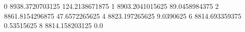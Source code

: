 0 8938.3720703125 124.2138671875
1 8903.2041015625 89.0458984375
2 8861.8154296875 47.6572265625
4 8823.197265625 9.0390625
6 8814.693359375 0.53515625
8 8814.158203125 0.0
